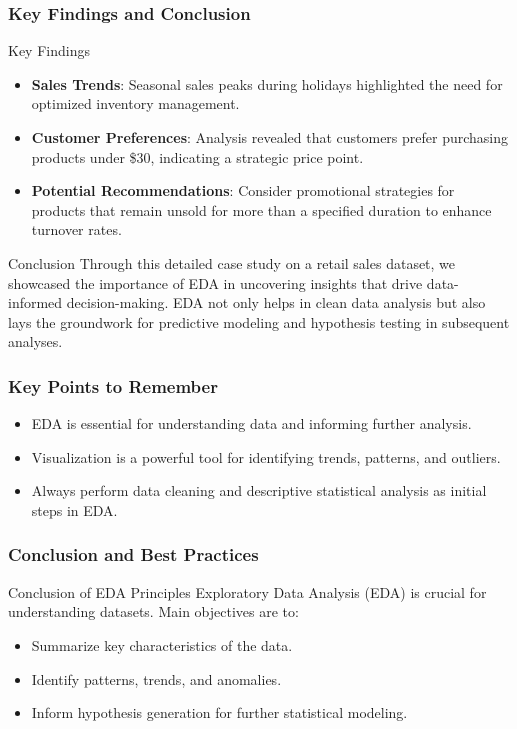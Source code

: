 \documentclass{beamer}
\begin{document}
\begin{frame}[fragile]
    \frametitle{Key Findings and Conclusion}
    \begin{block}{Key Findings}
        \begin{itemize}
            \item \textbf{Sales Trends}: Seasonal sales peaks during holidays highlighted the need for optimized inventory management.
            \item \textbf{Customer Preferences}: Analysis revealed that customers prefer purchasing products under \$30, indicating a strategic price point.
            \item \textbf{Potential Recommendations}: Consider promotional strategies for products that remain unsold for more than a specified duration to enhance turnover rates.
        \end{itemize}
    \end{block}

    \begin{block}{Conclusion}
        Through this detailed case study on a retail sales dataset, we showcased the importance of EDA in uncovering insights that drive data-informed decision-making.
        EDA not only helps in clean data analysis but also lays the groundwork for predictive modeling and hypothesis testing in subsequent analyses.
    \end{block}
\end{frame}

\begin{frame}[fragile]
    \frametitle{Key Points to Remember}
    \begin{itemize}
        \item EDA is essential for understanding data and informing further analysis.
        \item Visualization is a powerful tool for identifying trends, patterns, and outliers.
        \item Always perform data cleaning and descriptive statistical analysis as initial steps in EDA.
    \end{itemize}
\end{frame}

\begin{frame}[fragile]
    \frametitle{Conclusion and Best Practices}

    \begin{block}{Conclusion of EDA Principles}
        Exploratory Data Analysis (EDA) is crucial for understanding datasets. Main objectives are to:
        \begin{itemize}
            \item Summarize key characteristics of the data.
            \item Identify patterns, trends, and anomalies.
            \item Inform hypothesis generation for further statistical modeling.
        \end{itemize}
    \end{block}
\end{frame}
\end{document}
